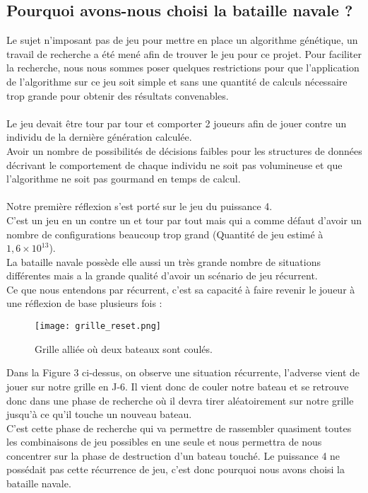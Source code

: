 \documentclass[12pt]{report}
\begin{document}
	\subsection{Pourquoi avons-nous choisi la bataille navale ?}
	Le sujet n'imposant pas de jeu pour mettre en place un algorithme génétique, un travail de recherche a été mené afin de trouver le jeu pour ce projet. Pour faciliter la recherche, nous nous sommes poser quelques restrictions pour que l'application de l'algorithme sur ce jeu soit simple et sans une quantité de calculs nécessaire trop grande pour obtenir des résultats convenables.\\\\
	Le jeu devait être tour par tour et comporter 2 joueurs afin de jouer contre un individu de la dernière génération calculée.\\
	Avoir un nombre de possibilités de décisions faibles pour les structures de données décrivant le comportement de chaque individu ne soit pas volumineuse et que l'algorithme ne soit pas gourmand en temps de calcul.\\\\
	Notre première réflexion s'est porté sur le jeu du puissance 4.\\
	C'est un jeu en un contre un et tour par tout mais qui a comme défaut d'avoir un nombre de configurations beaucoup trop grand (Quantité de jeu estimé à $1,6 \times 10^{13}$).\\
	La bataille navale possède elle aussi un très grande nombre de situations différentes mais a la grande qualité d'avoir un scénario de jeu récurrent.\\
	Ce que nous entendons par récurrent, c'est sa capacité à faire revenir le joueur à une réflexion de base plusieurs fois :\\
	\begin{figure}[h]
    	\begin{center}
		\texttt{[image: grille\_reset.png]}
		\caption{Grille alliée où deux bateaux sont coulés.}
		\end{center}
	\end{figure}
	\newpage
	Dans la Figure 3 ci-dessus, on observe une situation récurrente, l'adverse vient de jouer sur notre grille en J-6. Il vient donc de couler notre bateau et se retrouve donc dans une phase de recherche où il devra tirer aléatoirement sur notre grille jusqu'à ce qu'il touche un nouveau bateau.\\
	C'est cette phase de recherche qui va permettre de rassembler quasiment toutes les combinaisons de jeu possibles en une seule et nous permettra de nous concentrer sur la phase de destruction d'un bateau touché. Le puissance 4 ne possédait pas cette récurrence de jeu, c'est donc pourquoi nous avons choisi la bataille navale.\\
	
\end{document}
